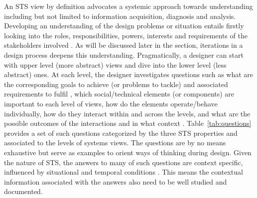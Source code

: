 An STS view by definition advocates a systemic approach towards understanding including but not limited to information acquisition, diagnosis and analysis. Developing an understanding of the design problems or situation entails firstly looking into the roles, responsibilities, powers, interests and requirements of the stakeholders involved \cite{Checkland1981}. As will be discussed later in the section, iterations in a design process deepens this understanding. 
Pragmatically, a designer can start with upper level (more abstract) views and dive into the lower level (less abstract) ones. %
At each level, the designer investigates questions such as what are the corresponding goals to achieve (or problems to tackle) \cite{Checkland1981,Waterson2002} and associated requirements to fulfil \cite{Whitworth2009a}, which social/technical elements (or components) are important to each level of views, how do the elements operate/behave individually, how do they interact within and across the levels, and what are the possible outcomes of the interactions and in what context \cite{Baxter2011}. 
%
Table~\ref{tab:questions} provides a set of such questions categorized by the three STS properties and associated to the levels of systems views. The questions are by no means exhaustive but serve as examples to orient ways of thinking during design. 
Given the nature of STS, the answers to many of such questions are context specific, influenced by situational and temporal conditions \cite{Baxter2011,Norman2015}. This means the contextual information associated with the answers also need to be well studied and documented. 
% 
